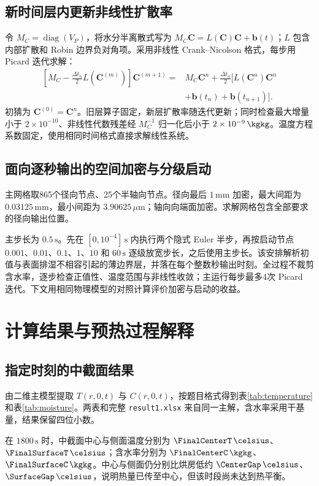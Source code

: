 \subsection{新时间层内更新非线性扩散率}
令 $M_C=\operatorname{diag}(V_P)$，将水分半离散式写为 $M_C\dot{\bm C}=L(\bm C)\bm C+\bm b(t)$；$L$ 包含内部扩散和 Robin 边界负对角项。采用非线性 Crank--Nicolson 格式，每步用 Picard 迭代求解：
\begin{equation}
\begin{aligned}
\left[M_C-\frac{\Delta t_n}{2}L(\bm C^{(m)})\right]\bm C^{(m+1)}
={}&M_C\bm C^n+\frac{\Delta t_n}{2}\bigl[L(\bm C^n)\bm C^n\\
&+\bm b(t_n)+\bm b(t_{n+1})\bigr].
\end{aligned}
\label{eq:picard}
\end{equation}
初猜为 $\bm C^{(0)}=\bm C^n$。旧层算子固定，新层扩散率随迭代更新；同时检查最大增量小于 $2\times10^{-10}$、非线性代数残差经 $M_C^{-1}$ 归一化后小于 $2\times10^{-9}\,\kgkg$。温度方程系数固定，使用相同时间格式直接求解线性系统。

\subsection{面向逐秒输出的空间加密与分级启动}
主网格取865个径向节点、25个半轴向节点。径向最后 $1\,\mathrm{mm}$ 加密，最大间距为 $0.03125\,\mathrm{mm}$，最小间距为 $3.90625\,\mu\mathrm m$；轴向向端面加密。求解网格包含全部要求的径向输出位置。

主步长为 $0.5\,\mathrm{s}$。先在 $[0,10^{-4}]\,\mathrm{s}$ 内执行两个隐式 Euler 半步，再按启动节点 $0.001$、$0.01$、$0.1$、$1$、$10$ 和 $60\,\mathrm{s}$ 逐级放宽步长，之后使用主步长。该安排解析初值与表面排湿不相容引起的薄边界层，并落在每个整数秒输出时刻。全过程不裁剪含水率，逐步检查正值性、温度范围与非线性收敛；主运行每步最多4次 Picard 迭代。下文用相同物理模型的对照计算评价加密与启动的收益。

\clearpage
\section{计算结果与预热过程解释}
\subsection{指定时刻的中截面结果}
由二维主模型提取 $T(r,0,t)$ 与 $C(r,0,t)$，按题目格式得到表\ref{tab:temperature}和表\ref{tab:moisture}。两表和完整 \texttt{result1.xlsx} 来自同一主解，含水率采用干基量，结果保留四位小数。


在 $1800\,\mathrm{s}$ 时，中截面中心与侧面温度分别为 $\FinalCenterT\,\celsius$、$\FinalSurfaceT\,\celsius$；含水率分别为 $\FinalCenterC\,\kgkg$、$\FinalSurfaceC\,\kgkg$。中心与侧面仍分别比烘房低约 $\CenterGap\,\celsius$、$\SurfaceGap\,\celsius$，说明热量已传至中心，但该时段尚未达到热平衡。

